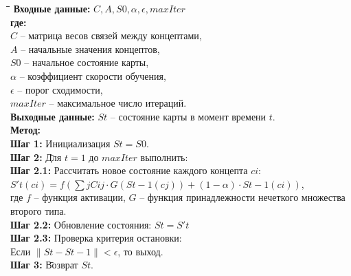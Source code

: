 \documentclass{article}
\begin{document}
    \begin{tabbing}
        \hspace*{2em}\= \hspace*{2em}\= \hspace*{2em}\= \kill
        \textbf{Входные данные:} $C, A, S0, \alpha, \epsilon, maxIter$ \\
        \> \textbf{где:}\\
        \> $C$ \> -- матрица весов связей между концептами,\\
        \> $A$ \> -- начальные значения концептов,\\
        \> $S0$ \> -- начальное состояние карты,\\
        \> $\alpha$ \> -- коэффициент скорости обучения,\\
        \> $\epsilon$ \> -- порог сходимости,\\
        \> $maxIter$ \> \> -- максимальное число итераций.\\
        \textbf{Выходные данные:} $St$ -- состояние карты в момент времени $t$.\\
        \textbf{Метод:} \\
        \> \textbf{Шаг 1:} Инициализация $St = S0$.\\
        \> \textbf{Шаг 2:} \= Для $t = 1$ до $maxIter$ выполнить:\\
        \> \> \textbf{Шаг 2.1:} Рассчитать новое состояние каждого концепта $ci$:\\
        \> \> \> $S't(ci) = f\left(\sum{j} C{ij} \cdot G(S{t-1}(cj)) + (1 - \alpha) \cdot S{t-1}(ci)\right)$,\\
        \> \> \> \hspace*{1em} где $f$ -- функция активации, $G$ -- функция принадлежности нечеткого множества второго типа. \\
        \> \> \textbf{Шаг 2.2:} Обновление состояния: $St = S't$ \\
        \> \> \textbf{Шаг 2.3:} Проверка критерия остановки:\\
        \> \> \> Если $\|St - S{t-1}\| < \epsilon$, то выход. \\
        \textbf{Шаг 3:} \= Возврат $St$. \\
    \end{tabbing}
\end{document}
